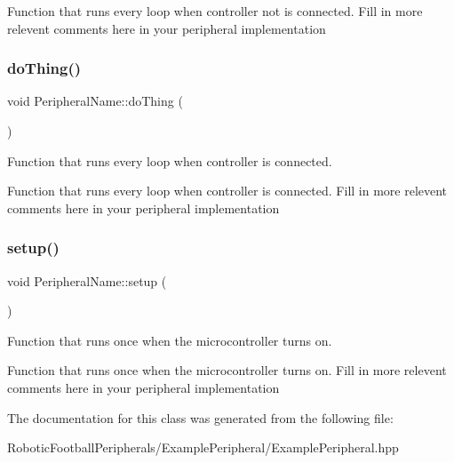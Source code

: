 Function that runs every loop when controller not is connected. Fill in more relevent comments here in your peripheral implementation \mbox{\label{class_peripheral_name_a42388889799a14fd6cda2c2819b0e38d}} 
\subsubsection{\texorpdfstring{do\+Thing()}{doThing()}}
{\footnotesize\ttfamily void Peripheral\+Name\+::do\+Thing (\begin{DoxyParamCaption}{ }\end{DoxyParamCaption})\hspace{0.3cm}{\ttfamily [inline]}}



Function that runs every loop when controller is connected. 

Function that runs every loop when controller is connected. Fill in more relevent comments here in your peripheral implementation \mbox{\label{class_peripheral_name_aa6b1719095b6e25d80a2567f400316db}} 
\subsubsection{\texorpdfstring{setup()}{setup()}}
{\footnotesize\ttfamily void Peripheral\+Name\+::setup (\begin{DoxyParamCaption}{ }\end{DoxyParamCaption})\hspace{0.3cm}{\ttfamily [inline]}}



Function that runs once when the microcontroller turns on. 

Function that runs once when the microcontroller turns on. Fill in more relevent comments here in your peripheral implementation 

The documentation for this class was generated from the following file\+:\begin{DoxyCompactItemize}
\item 
Robotic\+Football\+Peripherals/\+Example\+Peripheral/Example\+Peripheral.\+hpp\end{DoxyCompactItemize}
